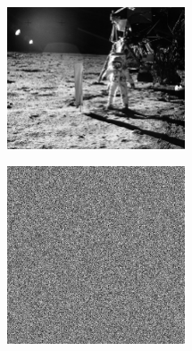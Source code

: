 \documentclass[xcolor=dvipsnames,presentation]{beamer}    %
\begin{document}
\begin{frame}{\insertsubsection}
\begin{figure}[T]
  \centering
  \includegraphics[width=0.470\textwidth]{bilder/moon.jpg}
  \hfill
\end{figure}
\end{frame}

\begin{frame}{\insertsubsection}
\begin{figure}[T]
  \centering
  \includegraphics[width=0.470\textwidth]{bilder/uniformnoise.png}
  \hfill
\end{figure}
\end{frame}
\end{document}
